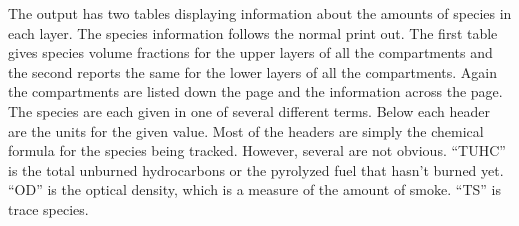 The output has two tables displaying information about the amounts of species in each layer. The species information follows the normal print out.  The first table gives species volume fractions for the upper layers of all the compartments and the second reports the same for the lower layers of all the compartments.  Again the compartments are listed down the page and the information across the page.  The species are each given in one of several different terms.  Below each header are the units for the given value.  Most of the headers are simply the chemical formula for the species being tracked.  However, several are not obvious.  ``TUHC'' is the total unburned hydrocarbons or the pyrolyzed fuel that hasn't burned yet.  ``OD'' is the optical density, which is a measure of the amount of smoke. ``TS'' is trace species.

